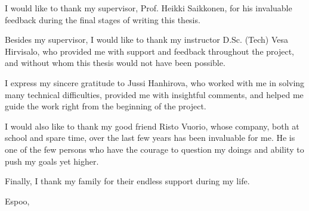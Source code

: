 I would like to thank my supervisor, Prof. Heikki Saikkonen, for his invaluable feedback during the final stages of writing this thesis.

Besides my supervisor, I would like to thank my instructor D.Sc. (Tech) Vesa Hirvisalo, who provided me with support and feedback throughout the project, and without whom this thesis would not have been possible.

I express my sincere gratitude to Jussi Hanhirova, who worked with me in solving many technical difficulties, provided me with insightful comments, and helped me guide the work right from the beginning of the project.

I would also like to thank my good friend Risto Vuorio, whose company, both at school and spare time, over the last few years has been invaluable for me. He is one of the few persons who have the courage to question my doings and ability to push my goals yet higher.

Finally, I thank my family for their endless support during my life.

\vskip 10mm

\noindent Espoo, \DATE
\vskip 5mm
\noindent\AUTHOR


